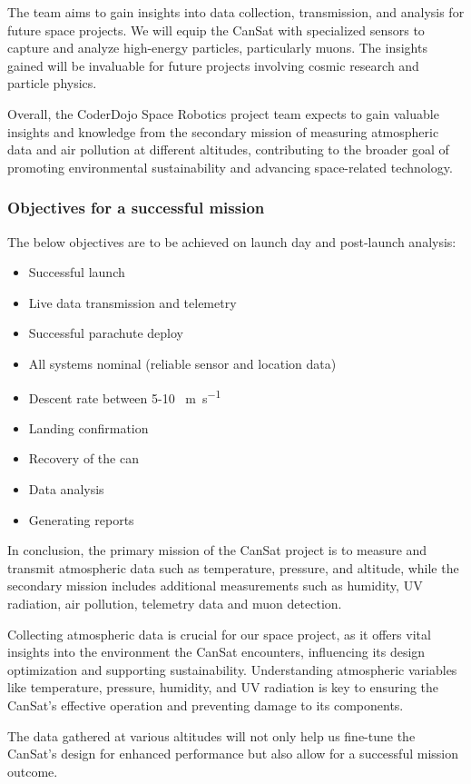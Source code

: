 The team aims to gain insights into data collection, transmission, and analysis for future space projects. We will equip the CanSat with specialized sensors to capture and analyze high-energy particles, particularly muons. The insights gained will be invaluable for future projects involving cosmic research and particle physics.

Overall, the CoderDojo Space Robotics project team expects to gain valuable insights and knowledge from the secondary mission of measuring atmospheric data and air pollution at different altitudes, contributing to the broader goal of promoting environmental sustainability and advancing space-related technology.

\subsubsection{Objectives for a successful mission}

The below objectives are to be achieved on launch day and post-launch analysis:
\begin{multicols}{2}[\vspace{-0.75\baselineskip}]
\begin{itemize}[leftmargin=1cm,itemindent=0.5cm, noitemsep, topsep=2pt, label=]
    \item Successful launch
    \item Live data transmission and  telemetry
    \item Successful parachute deploy
    \item All systems nominal (reliable sensor and location data)
    \item Descent rate between 5-10 \SI{}{\meter\per\second}
    \item Landing confirmation
    \item Recovery of the can
    \item Data analysis
    \item Generating reports
\end{itemize}
\end{multicols}

In conclusion, the primary mission of the CanSat project is to measure and transmit atmospheric data such as temperature, pressure, and altitude, while the secondary mission includes additional measurements such as humidity, UV radiation, air pollution, telemetry data and muon detection. 


Collecting atmospheric data is crucial for our space project, as it offers vital insights into the environment the CanSat encounters, influencing its design optimization and supporting sustainability. Understanding atmospheric variables like temperature, pressure, humidity, and UV radiation is key to ensuring the CanSat's effective operation and preventing damage to its components.

The data gathered at various altitudes will not only help us fine-tune the CanSat's design for enhanced performance but also allow for a successful mission outcome.